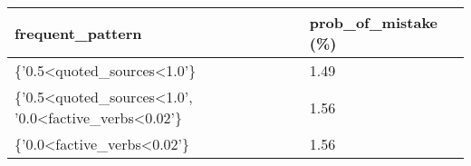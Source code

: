 \begin{tabular}{|l|l|}
\hline
\textbf{frequent\_pattern}                                                                         & \textbf{prob\_of\_mistake (\%)} \\ \hline
\{'0.5\textless{}quoted\_sources\textless{}1.0'\}                                                  & 1.49                            \\ \hline
\{'0.5\textless{}quoted\_sources\textless{}1.0',   '0.0\textless{}factive\_verbs\textless{}0.02'\} & 1.56                            \\ \hline
\{'0.0\textless{}factive\_verbs\textless{}0.02'\}                                                  & 1.56                            \\ \hline
\end{tabular}